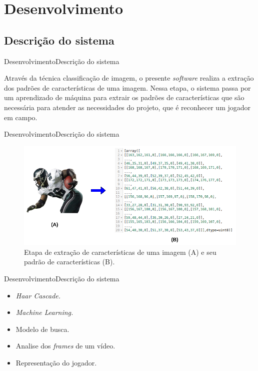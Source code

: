 \section{Desenvolvimento}
\subsection{Descrição do sistema}
\begin{frame}{Desenvolvimento}{Descrição do sistema}

Através da técnica classificação de imagem, o presente \textit{software} realiza a extração dos padrões de características de uma imagem. Nessa etapa, o sistema passa por um aprendizado de máquina para extrair os padrões de características que são necessária para atender as necessidades do projeto, que é reconhecer um jogador em campo.

\end{frame}

\begin{frame}{Desenvolvimento}{Descrição do sistema}
\begin{figure}
    \centering
    \caption{\label{fig_conversao_img}Etapa de extração de características de uma imagem (A) e seu padrão de características (B).}
    \includegraphics[scale=0.4]{05-SLIDES_DESENVOLVIMENTO/Imagens/conversao-de-imagem.png}
\end{figure}
\end{frame}

\begin{frame}{Desenvolvimento}{Descrição do sistema}
\begin{itemize}
    \item<1> \textit{Haar Cascade.}
    \item<1> \textit{Machine Learning.}
    \item<1> Modelo de busca.
    \item<1> Analise dos \textit{frames} de um vídeo.
    \item<1> Representação do jogador.
\end{itemize}
\end{frame}

